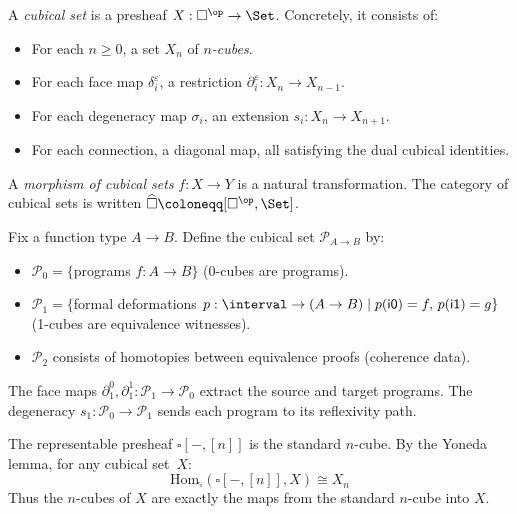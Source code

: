 \begin{definition}
\label{def:cubical-set}
A \emph{cubical set} is a presheaf $X : \square^{\op} \to \Set$.
Concretely, it consists of:
\begin{itemize}
  \item For each $n \geq 0$, a set $X_n$ of \emph{$n$-cubes}.
  \item For each face map $\delta_i^\varepsilon$, a restriction
    $\partial_i^\varepsilon : X_n \to X_{n-1}$.
  \item For each degeneracy map $\sigma_i$, an extension
    $s_i : X_n \to X_{n+1}$.
  \item For each connection, a diagonal map, all satisfying the
    dual cubical identities.
\end{itemize}
A \emph{morphism of cubical sets} $f : X \to Y$ is a natural transformation.
The category of cubical sets is written $\widehat{\square} \coloneqq [\square^{\op}, \Set]$.
\end{definition}

\begin{example}
\label{ex:programs-cubical}
Fix a function type $A \to B$.  Define the cubical set $\mathcal{P}_{A \to B}$ by:
\begin{itemize}
  \item $\mathcal{P}_0 = \{$programs $f : A \to B\}$ (0-cubes are programs).
  \item $\mathcal{P}_1 = \{$formal deformations $p : \interval \to (A \to B)
    \mid p(\mathsf{i0}) = f,\, p(\mathsf{i1}) = g\}$ (1-cubes are equivalence
    witnesses).
  \item $\mathcal{P}_2$ consists of homotopies between equivalence proofs
    (coherence data).
\end{itemize}
The face maps $\partial_1^0, \partial_1^1 : \mathcal{P}_1 \to \mathcal{P}_0$
extract the source and target programs.  The degeneracy $s_1 : \mathcal{P}_0
\to \mathcal{P}_1$ sends each program to its reflexivity path.
\end{example}

\begin{theorem}
\label{thm:yoneda-cube}
The representable presheaf $\square[-, [n]]$ is the standard $n$-cube.
By the Yoneda lemma, for any cubical set~$X$:
\[
  \mathrm{Hom}_{\widehat{\square}}(\square[-, [n]], X) \cong X_n
\]
Thus the $n$-cubes of $X$ are exactly the maps from the standard $n$-cube into $X$.
\end{theorem}

